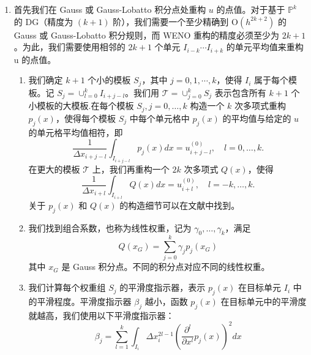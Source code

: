 \documentclass{article}
\numberwithin{equation}{subsection}    %
\begin{document}
\begin{enumerate}[label={{\bf Step \arabic*}:}]
    \item 首先我们在 Gauss 或 Gauss-Lobatto 积分点处重构 $u$ 的点值。对于基于 $\mathbb{P}^{k}$ 的 DG（精度为 $(k+1)$ 阶），我们需要一个至少精确到 $\mathrm{O}\left(h^{2 k+2}\right)$ 的 Gauss 或 Gauss-Lobatto 积分规则，而 WENO 重构的精度必须至少为 $2 k+1$。为此，我们需要使用相邻的 $2 k+1$ 个单元 $I_{i-k}\cdots I_{i+k}$ 的单元平均值来重构 u 的点值。
          \begin{enumerate}[label={\bf Step 1.\arabic*.}]
              \item 我们确定 $k+1$ 个小的模板 $S_{j}$，其中 $j=0,1,\cdots,k$，使得 $I_{i}$ 属于每个模板。记 $S_{j}=\cup_{l=0}^{k} I_{i+j-l}$。我们用 $\mathcal{T}=\cup_{j=0}^{k} S_{j}$ 表示包含所有 $k+1$ 个小模板的大模板.在每个模板 $S_j, j=0,\ldots,k$ 构造一个 $k$ 次多项式重构 $p_j(x)$，使得每个模板 $S_j$ 中每个单元格中 $p_j(x)$ 的平均值与给定的 $u$ 的单元格平均值相符，即\begin{equation}
                        \frac{1}{\Delta x_{i+j-l}} \int_{I_{i+j-l}} p_{j}(x) dx =u_{i+j-l}^{(0)},\quad l=0,\ldots,k.
                    \end{equation}
                    在更大的模板 $\mathcal{T}$ 上，我们再重构一个 $2k$ 次多项式 $Q(x)$，使得
                    \begin{equation}
                        \frac{1}{\Delta x_{i+l}} \int_{I_{i+l}} Q(x) dx=u_{i+l}^{(0)},\quad l=-k,\ldots,k.
                    \end{equation}
                    关于 $p_j(x)$ 和 $Q(x)$ 的构造细节可以在文献\cite{WENO5}中找到。
              \item 我们找到组合系数，也称为线性权重，记为 $\gamma_{0},\ldots,\gamma_{k}$，满足
                    \begin{equation}
                        Q(x_G)=\sum_{j=0}^k\gamma_j p_j(x_G)
                    \end{equation}
                    其中 $x_G$ 是 Gauss 积分点。不同的积分点对应不同的线性权重。
              \item 我们计算每个权重组 $S_j$ 的平滑度指示器，表示 $p_j(x)$ 在目标单元 $I_i$ 中的平滑程度。平滑度指示器 $\beta_j$ 越小，函数 $p_j(x)$ 在目标单元中的平滑度就越高，我们使用以下平滑度指示器：
                    \begin{equation}
                        \beta_{j}=\sum_{l=1}^{k} \int_{I_{i}} \Delta x_{i}^{2 l-1}\left(\frac{\partial^{l}}{\partial x^{l}} p_{j}(x)\right)^{2} d x
                    \end{equation}

\end{enumerate}
\end{enumerate}
\end{document}
